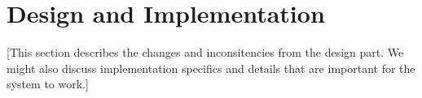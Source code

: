 \section{Design and Implementation}\label{Design and Implementation}
    [This section describes the changes and inconsitencies from the design part. We might also discuss implementation specifics and details that are important for the system to work.]

    
    
    
    
